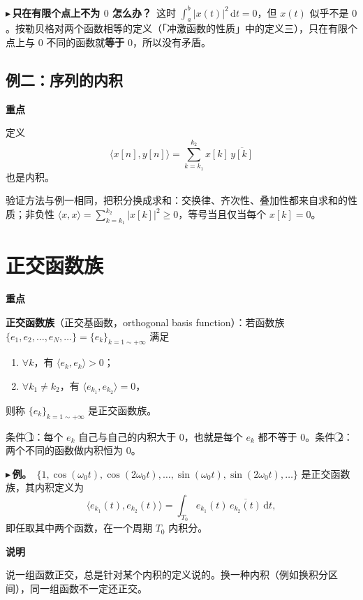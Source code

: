 \documentclass[UTF8,a4paper,11pt]{ctexart}
\newenvironment{remember}{\begin{rememberbox}\textbf{重点}\par\smallskip}{\end{rememberbox}}
\newenvironment{note}{\begin{notebox}\textbf{说明}\par\smallskip}{\end{notebox}}
\newcounter{ex}[section]
\newcommand{\point}[1]{\par\addvspace{1ex}\noindent\textcolor{ptteal}{$\blacktriangleright$\,\textbf{#1}}\ }
\begin{document}
\point{只在有限个点上不为 $0$ 怎么办？}这时 $\int_a^b|x(t)|^2\,\mathrm{d}t=0$，但 $x(t)$ 似乎不是 $0$。按勒贝格对两个函数相等的定义（「冲激函数的性质」中的定义三），只在有限个点上与 $0$ 不同的函数就\textbf{等于} $0$，所以没有矛盾。

\subsection{例二：序列的内积}
\begin{remember}
定义
\[
\langle x[n],y[n]\rangle=\sum_{k=k_1}^{k_2}x[k]\,\overline{y[k]}
\]
也是内积。
\end{remember}
验证方法与例一相同，把积分换成求和：交换律、齐次性、叠加性都来自求和的性质；非负性 $\langle x,x\rangle=\sum_{k=k_1}^{k_2}|x[k]|^2\ge0$，等号当且仅当每个 $x[k]=0$。

\section{正交函数族}\label{sec:orth}
\begin{remember}
\textbf{正交函数族}（正交基函数，orthogonal basis function）：若函数族 $\{e_1,e_2,\dots,e_N,\dots\}=\{e_k\}_{k=1\sim+\infty}$ 满足
\begin{enumerate}[nosep,label=\textcircled{\scriptsize\arabic*}]
\item $\forall k$，有 $\langle e_k,e_k\rangle>0$；
\item $\forall k_1\ne k_2$，有 $\langle e_{k_1},e_{k_2}\rangle=0$，
\end{enumerate}
则称 $\{e_k\}_{k=1\sim+\infty}$ 是正交函数族。
\end{remember}
条件 \textcircled{\scriptsize 1}：每个 $e_k$ 自己与自己的内积大于 $0$，也就是每个 $e_k$ 都不等于 $0$。条件 \textcircled{\scriptsize 2}：两个不同的函数做内积恒为 $0$。

\point{例。}$\{1,\cos(\omega_0t),\cos(2\omega_0t),\dots,\sin(\omega_0t),\sin(2\omega_0t),\dots\}$ 是正交函数族，其内积定义为
\[
\langle e_{k_1}(t),e_{k_2}(t)\rangle=\int_{T_0}e_{k_1}(t)\,\overline{e_{k_2}(t)}\,\mathrm{d}t ,
\]
即任取其中两个函数，在一个周期 $T_0$ 内积分。

\begin{note}
说一组函数正交，总是针对某个内积的定义说的。换一种内积（例如换积分区间），同一组函数不一定还正交。
\end{note}

\end{document}
